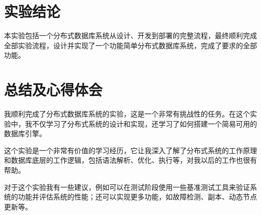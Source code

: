 \section{实验结论}

本实验包括一个分布式数据库系统从设计、开发到部署的完整流程，最终顺利完成全部实验流程，设计并实现了一个功能简单分布式数据库系统，完成了要求的全部功能。

\section{总结及心得体会}

我顺利完成了分布式数据库系统的实验，这是一个非常有挑战性的任务。在这个实验中，我不仅学习了分布式系统的设计和实现，还学习了如何搭建一个简易可用的数据库引擎。

这个实验是一个非常有价值的学习经历，它让我深入了解了分布式系统的工作原理和数据库底层的工作逻辑，包括语法解析、优化、执行等，对我以后的工作也很有帮助。

对于这个实验我有一些建议，例如可以在测试阶段使用一些基准测试工具来验证系统的功能并评估系统的性能；还可以实现更多功能，如故障检测、副本、动态节点更新等。